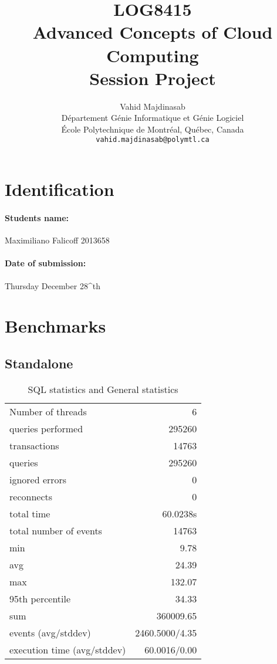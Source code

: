 \documentclass[11pt]{article}
\title{LOG8415\\Advanced Concepts of Cloud Computing\\Session Project}
\author{
    Vahid Majdinasab \\
    D\'{e}partement G\'{e}nie Informatique et G\'{e}nie Logiciel \\
    \'{E}cole Polytechnique de Montr\'{e}al, Qu\'{e}bec, Canada \\
    \texttt{vahid.majdinasab@polymtl.ca} \\
}
\date{}
\def\auteur{}
\begin{document}
\maketitle

\section{Identification}

\paragraph{Students name:} Maximiliano Falicoff 2013658
\auteur

\paragraph{Date of submission:} Thursday December 28^{th} 

\section{Benchmarks}
\subsection{Standalone}

\begin{table}[H]
\centering
\begin{tabular}{ l r }
\hline
Number of threads & 6 \\
queries performed & 295260 \\
transactions & 14763 \\
queries & 295260 \\
ignored errors & 0 \\
reconnects & 0 \\
total time & 60.0238s \\
total number of events & 14763 \\
min & 9.78 \\
avg & 24.39 \\
max & 132.07 \\
95th percentile & 34.33 \\
sum & 360009.65 \\
events (avg/stddev) & 2460.5000/4.35 \\
execution time (avg/stddev) & 60.0016/0.00 \\
\hline
\end{tabular}
\caption{SQL statistics and General statistics}
\label{tab:table1}
\end{table}
\end{document}
